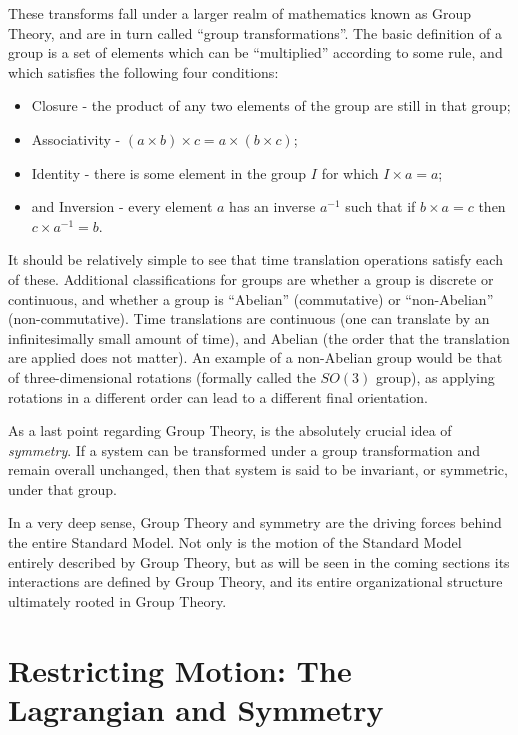     These transforms fall under a larger realm of mathematics known as Group Theory,
        and are in turn called ``group transformations''.
    The basic definition of a group is a set of elements which can be ``multiplied'' according to some rule,
        and which satisfies the following four conditions\cite{Cheng_book}:
    \begin{itemize}
        \item Closure - the product of any two elements of the group are still in that group;
        \item Associativity - $(a \times b)\times c = a\times(b \times c)$;
        \item Identity - there is some element in the group $I$ for which $I \times a=a$;
        \item and Inversion - every element $a$ has an inverse $a^{-1}$ such that if $b \times a = c$ then $c \times a^{-1} = b$.
    \end{itemize}

    It should be relatively simple to see that time translation operations satisfy each of these.
    Additional classifications for groups are whether a group is discrete or continuous,
        and whether a group is ``Abelian'' (commutative) or ``non-Abelian'' (non-commutative).
    Time translations are continuous (one can translate by an infinitesimally small amount of time),
        and Abelian (the order that the translation are applied does not matter).
    An example of a non-Abelian group would be that of three-dimensional rotations (formally called the $SO(3)$ group),
        as applying rotations in a different order can lead to a different final orientation.

    As a last point regarding Group Theory, is the absolutely crucial idea of \textit{symmetry}.
    If a system can be transformed under a group transformation and remain overall unchanged,
        then that system is said to be invariant, or symmetric, under that group.

    In a very deep sense, Group Theory and symmetry are the driving forces behind the entire Standard Model.
    Not only is the motion of the Standard Model entirely described by Group Theory,
        but as will be seen in the coming sections its interactions are defined by Group Theory,
        and its entire organizational structure ultimately rooted in Group Theory.


\section{Restricting Motion: The Lagrangian and Symmetry}
    
